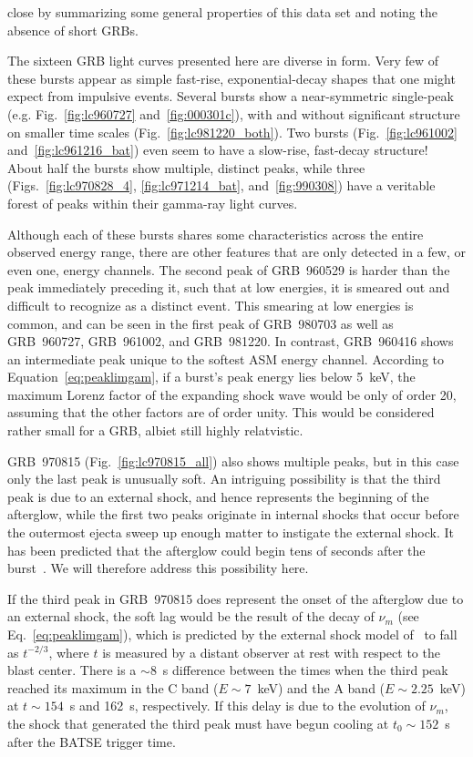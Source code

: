\documentclass{aastex}
\begin{document}
\begin{multicols}{2}

\noindent
close by summarizing some general properties of this data set and
noting the absence of short GRBs.

The sixteen GRB light curves presented here are diverse in form.  Very
few of these bursts appear as simple fast-rise, exponential-decay
shapes that one might expect from impulsive events.  Several bursts
show a near-symmetric single-peak (e.g. Fig.~\ref{fig:lc960727}
and~\ref{fig:000301c}), with and without significant structure on
smaller time scales (Fig.~\ref{fig:lc981220_both}).  Two bursts
(Fig.~\ref{fig:lc961002} and~\ref{fig:lc961216_bat}) even seem to have
a slow-rise, fast-decay structure!  About half the bursts show
multiple, distinct peaks, while three (Figs.~\ref{fig:lc970828_4},
\ref{fig:lc971214_bat}, and~\ref{fig:990308}) have a veritable forest
of peaks within their gamma-ray light curves.


Although each of these bursts shares some characteristics across the
entire observed energy range, there are other features that are only
detected in a few, or even one, energy channels.  The second peak of
GRB~960529 is harder than the peak immediately preceding it, such that
at low energies, it is smeared out and difficult to recognize as a
distinct event.  This smearing at low energies is common, and can be
seen in the first peak of GRB~980703 as well as GRB~960727,
GRB~961002, and GRB~981220.  In contrast, GRB~960416 shows an
intermediate peak unique to the softest ASM energy channel.  According
to Equation~\ref{eq:peaklimgam}, if a burst's peak energy lies below
5~keV, the maximum Lorenz factor of the expanding shock wave would be
only of order 20, assuming that the other factors are of order unity.
This would be considered rather small for a GRB, albiet still highly
relatvistic.

GRB~970815 (Fig.~\ref{fig:lc970815_all}) also shows multiple peaks,
but in this case only the last peak is unusually soft.  An intriguing
possibility is that the third peak is due to an external shock, and
hence represents the beginning of the afterglow, while the first two
peaks originate in internal shocks that occur before the outermost
ejecta sweep up enough matter to instigate the external shock.  It has
been predicted that the afterglow could begin tens of seconds after
the burst~\citep{sari97,sp99}.  We will therefore address this
possibility here.

If the third peak in GRB~970815 does represent the onset of the
afterglow due to an external shock, the soft lag would be the result
of the decay of $\nu_m$ (see Eq.~\ref{eq:peaklimgam}), which is
predicted by the external shock model of~\citet{mr97} to fall as
$t^{-2/3}$, where $t$ is measured by a distant observer at rest with
respect to the blast center.  There is a $\sim8$~s difference between
the times when the third peak reached its maximum in the C band
($E\sim7$~keV) and the A band ($E\sim2.25$~keV) at $t \sim 154$~s and
162~s, respectively.  If this delay is due to the evolution of
$\nu_m$, the shock that generated the third peak must have begun
cooling at $t_0 \sim 152$~s after the BATSE trigger time.  


\end{multicols}
\end{document}
